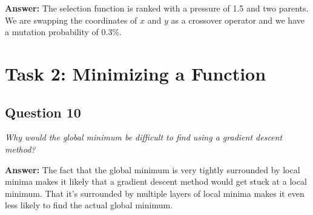 \documentclass[a4paper]{article}
\begin{document}
\textbf{Answer:}  The selection function is ranked with a pressure of 1.5 and two parents. We are swapping the coordinates of $x$ and $y$ as a crossover operator and we have a mutation probability of $0.3\%$. 

\section*{Task 2: Minimizing a Function}

\subsection*{Question 10}
\emph{Why would the global minimum be difficult to find using a gradient descent method?}

\textbf{Answer:} The fact that the global minimum is very tightly surrounded by local minima makes it likely that a gradient descent method would get stuck at a local minimum. That it's surrounded by multiple layers of local minima makes it even less likely to find the actual global minimum. 


\begin{table}[h]
\caption{Different Crossover Operations}
\label{table:crossover}
\end{table}
\end{document}
